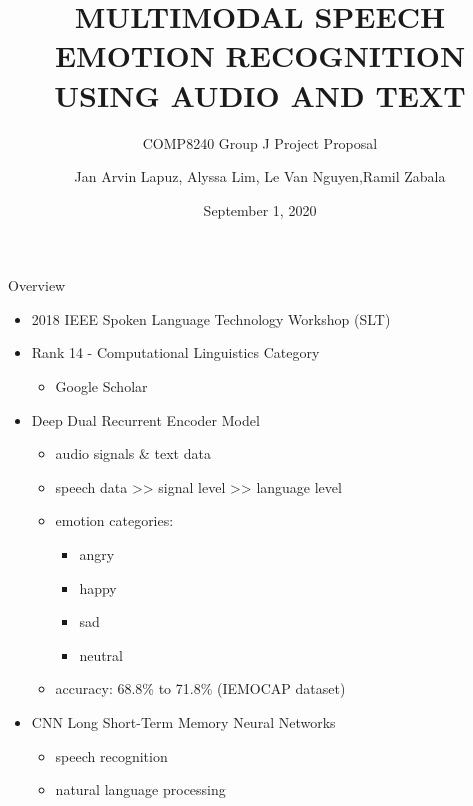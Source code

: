\documentclass{beamer}
\title{MULTIMODAL SPEECH EMOTION RECOGNITION USING AUDIO AND TEXT}
\subtitle{COMP8240 Group J Project Proposal}
\author{Jan Arvin Lapuz, Alyssa Lim, Le Van Nguyen,\break Ramil Zabala}
\date{September 1, 2020}
\begin{document}
    \begin{frame}
        \maketitle
    \end{frame}
    
    \begin{frame}{Overview}
        \begin{itemize}
            \item 2018 IEEE Spoken Language Technology Workshop (SLT)
            \item Rank 14 - Computational Linguistics Category 
                \begin{itemize}
                    \item Google Scholar
                \end{itemize}
            \item Deep Dual Recurrent Encoder Model
            \begin{itemize}
                \item audio signals \& text data
                \item speech data >> signal level >> language level
                \item emotion categories:
                \begin{itemize}
                    \item angry
                    \item happy
                    \item sad
                    \item neutral
                \end{itemize}
                \item accuracy: 68.8\% to 71.8\% (IEMOCAP dataset)
            \end{itemize}
            \item CNN Long Short-Term Memory Neural Networks
                \begin{itemize}
                    \item speech recognition
                    \item natural language processing
                \end{itemize}
        \end{itemize}
    \end{frame}
        
\end{document}
